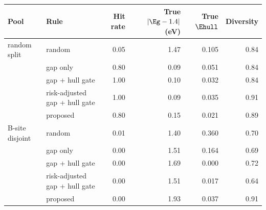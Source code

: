 \begin{tabular}{@{}llrrrr@{}}\toprule
 Pool & Rule & Hit rate & True $|\Eg-1.4|$ (eV) & True $\Ehull$ & Diversity\\\midrule
random split & random & 0.05 & 1.47 & 0.105 & 0.84 \\
 & gap only & 0.80 & 0.09 & 0.051 & 0.84 \\
 & gap + hull gate & 1.00 & 0.10 & 0.032 & 0.84 \\
 & risk-adjusted gap + hull gate & 1.00 & 0.09 & 0.035 & 0.91 \\
 & proposed & 0.80 & 0.15 & 0.021 & 0.89 \\
\midrule
B-site disjoint & random & 0.01 & 1.40 & 0.360 & 0.70 \\
 & gap only & 0.00 & 1.51 & 0.164 & 0.69 \\
 & gap + hull gate & 0.00 & 1.69 & 0.000 & 0.72 \\
 & risk-adjusted gap + hull gate & 0.00 & 1.51 & 0.017 & 0.64 \\
 & proposed & 0.00 & 1.93 & 0.037 & 0.91 \\

\bottomrule\end{tabular}
